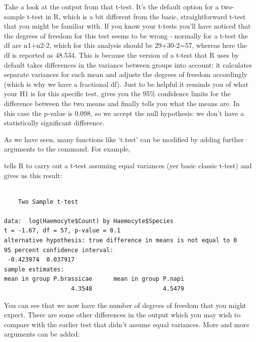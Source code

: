 \documentclass[
]{book}
\newenvironment{Shaded}{\begin{snugshade}}{\end{snugshade}}
\newcommand{\DataTypeTok}[1]{\textcolor[rgb]{0.13,0.29,0.53}{#1}}
\newcommand{\KeywordTok}[1]{\textcolor[rgb]{0.13,0.29,0.53}{\textbf{#1}}}
\newcommand{\NormalTok}[1]{#1}
\newcommand{\OperatorTok}[1]{\textcolor[rgb]{0.81,0.36,0.00}{\textbf{#1}}}
\newcommand{\OtherTok}[1]{\textcolor[rgb]{0.56,0.35,0.01}{#1}}
\begin{document}
Take a look at the output from that t-test. It's the default option for a two-sample t-test in R, which is a bit different from the basic, straightforward t-test that you might be familiar with. If you know your t-tests you'll have noticed that the degrees of freedom for this test seems to be wrong - normally for a t-test the df are n1+n2-2, which for this analysis should be 29+30-2=57, whereas here the df is reported as 48.534. This is because the version of a t-test that R uses by default takes differences in the variance between groups into account: it calculates separate variances for each mean and adjusts the degrees of freedom accordingly (which is why we have a fractional df). Just to be helpful it reminds you of what your H1 is for this specific test, gives you the 95\% confidence limits for the difference between the two means and finally tells you what the means are. In this case the p-value is 0.098, so we accept the null hypothesis: we don't have a statistically significant difference.

As we have seen, many functions like `t.test' can be modified by adding further arguments to the command. For example,

\begin{Shaded}
\end{Shaded}

tells R to carry out a t-test assuming equal variances (yer basic classic t-test) and gives us this result:

\begin{verbatim}

    Two Sample t-test

data:  log(Haemocyte$Count) by Haemocyte$Species
t = -1.67, df = 57, p-value = 0.1
alternative hypothesis: true difference in means is not equal to 0
95 percent confidence interval:
 -0.423974  0.037917
sample estimates:
mean in group P.brassicae      mean in group P.napi 
                   4.3548                    4.5479 
\end{verbatim}

You can see that we now have the number of degrees of freedom that you might expect. There are some other differences in the output which you may wish to compare with the earlier test that didn't assume equal variances. More and more arguments can be added:
\end{document}
